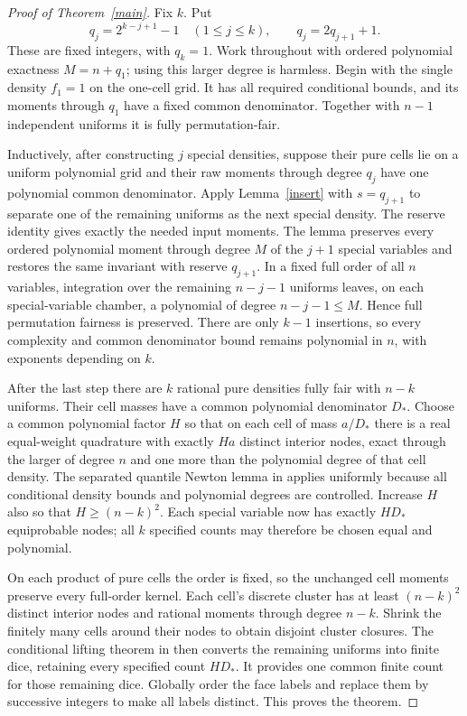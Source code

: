 \documentclass[11pt]{article}
\begin{document}
\begin{proof}[Proof of Theorem~\ref{main}]
Fix $k$. Put
\[
 q_j=2^{k-j+1}-1\quad(1\le j\le k),
 \qquad q_j=2q_{j+1}+1.
\]
These are fixed integers, with $q_k=1$. Work throughout with ordered
polynomial exactness $M=n+q_1$; using this larger degree is harmless.
Begin with the single density $f_1=1$ on the one-cell grid. It has all
required conditional bounds, and its moments through $q_1$ have a
fixed common denominator. Together with $n-1$ independent uniforms it
is fully permutation-fair.

Inductively, after constructing $j$ special densities, suppose their
pure cells lie on a uniform polynomial grid and their raw moments
through degree $q_j$ have one polynomial common denominator. Apply
Lemma~\ref{insert} with $s=q_{j+1}$ to separate one of the remaining
uniforms as the next special density. The reserve identity gives exactly
the needed input moments. The lemma preserves every ordered polynomial
moment through degree $M$ of the $j+1$ special variables and restores
the same invariant with reserve $q_{j+1}$. In a fixed full order of
all $n$ variables, integration over the remaining $n-j-1$ uniforms
leaves, on each special-variable chamber, a polynomial of degree
$n-j-1\le M$. Hence full permutation fairness is preserved.
There are only $k-1$ insertions, so every complexity and common
denominator bound remains polynomial in $n$, with exponents depending
on $k$.

After the last step there are $k$ rational pure densities fully fair
with $n-k$ uniforms. Their cell masses have a common polynomial
denominator $D_*$. Choose a common polynomial factor $H$ so that on
each cell of mass $a/D_*$ there is a real equal-weight quadrature with
exactly $Ha$ distinct interior nodes, exact through the larger of degree
$n$ and one more than the polynomial degree of that cell density.
The separated quantile Newton lemma in
applies uniformly because all conditional density bounds and polynomial
degrees are controlled. Increase $H$ also so that $H\ge(n-k)^2$.
Each special variable now has exactly $HD_*$ equiprobable nodes;
all $k$ specified counts may therefore be chosen equal and polynomial.

On each product of pure cells the order is fixed, so the unchanged
cell moments preserve every full-order kernel. Each cell's discrete
cluster has at least $(n-k)^2$ distinct interior nodes and rational
moments through degree $n-k$. Shrink the finitely many cells around
their nodes to obtain disjoint cluster closures. The conditional lifting
theorem in
then converts the remaining uniforms into finite dice, retaining every
specified count $HD_*$. It provides one common finite count for those
remaining dice. Globally order the face labels and replace them by
successive integers to make all labels distinct. This proves the theorem.
\end{proof}
\end{document}

